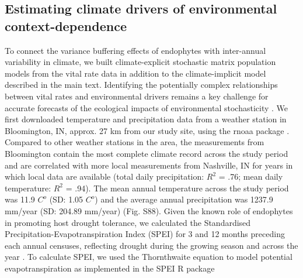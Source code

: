 \documentclass[lineno, sn-basic]{sn-jnl}%
\begin{document}
\subsection{Estimating climate drivers of environmental context-dependence}\label{SupMethods3}

To connect the variance buffering effects of endophytes with inter-annual variability in climate, we built climate-explicit stochastic matrix population models from the vital rate data in addition to the climate-implicit model described in the main text. 
Identifying the potentially complex relationships between vital rates and environmental drivers remains a key challenge for accurate forecasts of the ecological impacts of environmental stochasticity \citep{ehrlen2015predicting}.
We first downloaded temperature and precipitation data from a weather station in Bloomington, IN,  approx. 27 km from our study site, using the rnoaa package \citep{chamberlain2022package}. 
Compared to other weather stations in the area, the measurements from Bloomington contain the most complete climate record across the study period and are correlated with more local measurements from Nashville, IN for years in which local data are available (total daily precipitation: $R^2$ = .76; mean daily temperature: $R^2$ = .94).
The mean annual temperature across the study period was 11.9 $C^o $ (SD: 1.05 $C^o $) and the average annual precipitation was 1237.9 mm/year (SD: 204.89 mm/year) (Fig. S88).
Given the known role of endophytes in promoting host drought tolerance, we calculated the Standardised Precipitation-Evapotranspiration Index (SPEI) for 3 and 12 months preceding each annual censuses, reflecting drought during the growing season and across the year \citep{vicente2010multiscalar}.
To calculate SPEI, we used the Thornthwaite equation to model potential evapotranspiration as implemented in the SPEI R package \citep{begueria2013spei}
\end{document}
